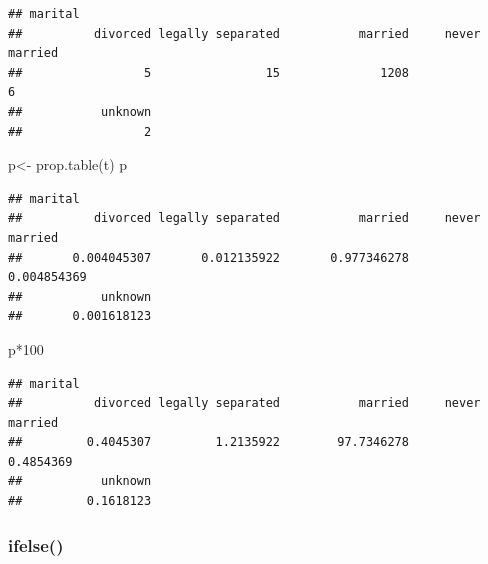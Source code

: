 \documentclass[
]{book}
\newenvironment{Shaded}{\begin{snugshade}}{\end{snugshade}}
\newcommand{\DecValTok}[1]{\textcolor[rgb]{0.00,0.00,0.81}{#1}}
\newcommand{\FunctionTok}[1]{\textcolor[rgb]{0.00,0.00,0.00}{#1}}
\newcommand{\NormalTok}[1]{#1}
\newcommand{\OtherTok}[1]{\textcolor[rgb]{0.56,0.35,0.01}{#1}}
\newcommand{\SpecialCharTok}[1]{\textcolor[rgb]{0.00,0.00,0.00}{#1}}
\newcommand{\StringTok}[1]{\textcolor[rgb]{0.31,0.60,0.02}{#1}}
\begin{document}
\begin{verbatim}
## marital
##          divorced legally separated           married     never married 
##                 5                15              1208                 6 
##           unknown 
##                 2
\end{verbatim}

\begin{Shaded}
\begin{Highlighting}[]
\NormalTok{p}\OtherTok{\textless{}{-}} \FunctionTok{prop.table}\NormalTok{(t)}
\NormalTok{p}
\end{Highlighting}
\end{Shaded}

\begin{verbatim}
## marital
##          divorced legally separated           married     never married 
##       0.004045307       0.012135922       0.977346278       0.004854369 
##           unknown 
##       0.001618123
\end{verbatim}

\begin{Shaded}
\begin{Highlighting}[]
\NormalTok{p}\SpecialCharTok{*}\DecValTok{100}
\end{Highlighting}
\end{Shaded}

\begin{verbatim}
## marital
##          divorced legally separated           married     never married 
##         0.4045307         1.2135922        97.7346278         0.4854369 
##           unknown 
##         0.1618123
\end{verbatim}

\hypertarget{ifelse}{%
\subsubsection*{ifelse()}\label{ifelse}}

\begin{Shaded}
\end{Shaded}
\end{document}
